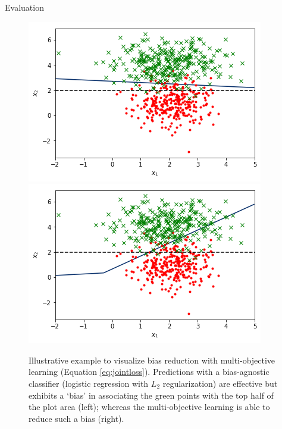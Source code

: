 \documentclass{beamer}
\begin{document}
\begin{frame}{Evaluation}
%
\begin{figure}[t]
\centering
\includegraphics[width=0.49\columnwidth]{biased_boundary.png}
\includegraphics[width=0.49\columnwidth]{debiased_boundary.png}
\caption{Illustrative example to visualize bias reduction with multi-objective learning (Equation \ref{eq:jointloss}). Predictions
with a bias-agnostic classifier (logistic regression with $L_2$ regularization) are effective but exhibits a `bias' in associating the green points with the top half of the plot area (left); whereas the multi-objective learning is able to reduce such a bias (right).
\label{fig:2d-data}}
\end{figure}
\end{frame}
%
\end{document}
